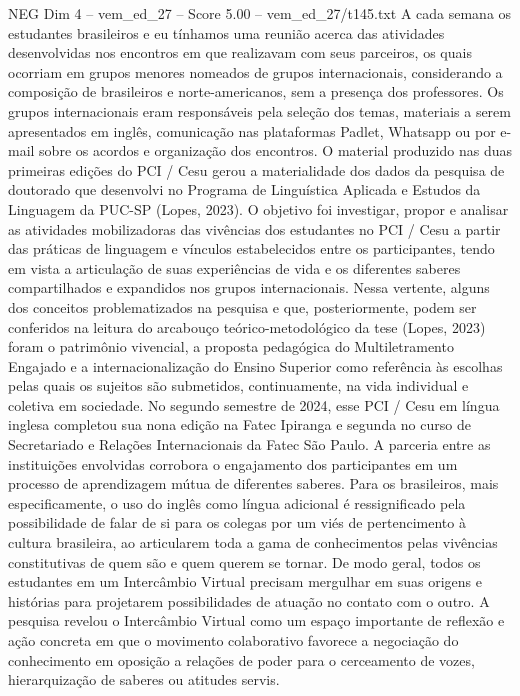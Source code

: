 \begin{textsample}{NEG Dim 4 – vem\_ed\_27 – Score 5.00 – vem\_ed\_27/t145.txt}
A cada semana os estudantes brasileiros e eu tínhamos uma reunião acerca das atividades desenvolvidas nos encontros em que realizavam com seus parceiros, os quais ocorriam em grupos menores nomeados de grupos internacionais, considerando a composição de brasileiros e norte-americanos, sem a presença dos professores.
Os grupos internacionais eram responsáveis pela seleção dos temas, materiais a serem apresentados em inglês, comunicação nas plataformas Padlet, Whatsapp ou por e-mail sobre os acordos e organização dos encontros.
O material produzido nas duas primeiras edições do PCI / Cesu gerou a materialidade dos dados da pesquisa de doutorado que desenvolvi no Programa de Linguística Aplicada e Estudos da Linguagem da PUC-SP (Lopes, 2023).
O objetivo foi investigar, propor e analisar as atividades mobilizadoras das vivências dos estudantes no PCI / Cesu a partir das práticas de linguagem e vínculos estabelecidos entre os participantes, tendo em vista a articulação de suas experiências de vida e os diferentes saberes compartilhados e expandidos nos grupos internacionais.
Nessa vertente, alguns dos conceitos problematizados na pesquisa e que, posteriormente, podem ser conferidos na leitura do arcabouço teórico-metodológico da tese (Lopes, 2023) foram o patrimônio vivencial, a proposta pedagógica do Multiletramento Engajado e a internacionalização do Ensino Superior como referência às escolhas pelas quais os sujeitos são submetidos, continuamente, na vida individual e coletiva em sociedade.
No segundo semestre de 2024, esse PCI / Cesu em língua inglesa completou sua nona edição na Fatec Ipiranga e segunda no curso de Secretariado e Relações Internacionais da Fatec São Paulo.
A parceria entre as instituições envolvidas corrobora o engajamento dos participantes em um processo de aprendizagem mútua de diferentes saberes.
Para os brasileiros, mais especificamente, o uso do inglês como língua adicional é ressignificado pela possibilidade de falar de si para os colegas por um viés de pertencimento à cultura brasileira, ao articularem toda a gama de conhecimentos pelas vivências constitutivas de quem são e quem querem se tornar.
De modo geral, todos os estudantes em um Intercâmbio Virtual precisam mergulhar em suas origens e histórias para projetarem possibilidades de atuação no contato com o outro.
A pesquisa revelou o Intercâmbio Virtual como um espaço importante de reflexão e ação concreta em que o movimento colaborativo favorece a negociação do conhecimento em oposição a relações de poder para o cerceamento de vozes, hierarquização de saberes ou atitudes servis.

\end{textsample}
